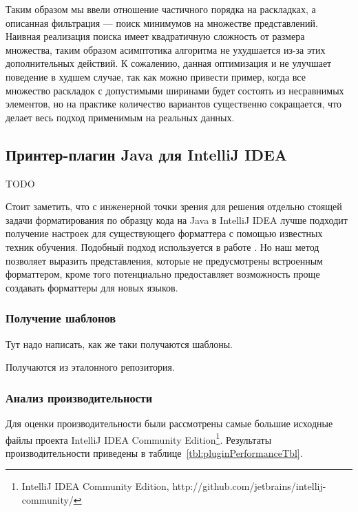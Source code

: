 Таким образом мы ввели отношение частичного порядка на раскладках, а
описанная фильтрация --- поиск минимумов на множестве представлений\cite{poset}.
Наивная реализация поиска имеет квадратичную сложность от размера множества,
таким образом асимптотика алгоритма не ухудшается из-за этих дополнительных
действий. К сожалению, данная оптимизация и не улучшает поведение
в худшем случае, так как
можно привести пример, когда все множество раскладок с допустимыми ширинами
будет состоять из несравнимых элементов, но на практике количество вариантов
существенно сокращается, что делает весь подход применимым на реальных данных.

\newpage
\subsection{Принтер-плагин Java для IntelliJ IDEA}

TODO

Стоит заметить, что с инженерной точки зрения для решения отдельно стоящей задачи
форматирования по образцу кода на Java в IntelliJ IDEA лучше подходит
получение настроек для существующего форматтера с помощью известных техник обучения.
Подобный подход используется в работе \cite{learning}.
Но наш метод позволяет выразить представления, которые не предусмотрены
встроенным форматтером, кроме того потенциально предоставляет возможность проще
создавать форматтеры для новых языков. 

\subsubsection{Получение шаблонов}
Тут надо написать, как же таки получаются шаблоны.

Получаются из эталонного репозитория.

\subsubsection{Анализ производительности}

Для оценки производительности были рассмотрены самые большие исходные файлы
проекта IntelliJ IDEA Community Edition\footnote{
IntelliJ IDEA Community Edition,
http://github.com/jetbrains/intellij-community/}.
Результаты производительности приведены в
таблице~\ref{tbl:pluginPerformanceTbl}.

